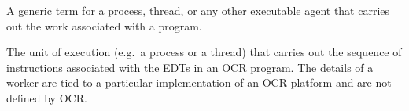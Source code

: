 \glossarydefstart
A generic term for a process, thread, or any other executable agent
that carries out the work associated with a program.
\glossarydefend



\glossarydefstart
The unit of execution (e.g.\ a process or a thread) that carries out
the sequence of instructions associated with the EDTs in an OCR
program. The details of a worker are tied to a particular
implementation of an OCR platform and are not defined by OCR.
\glossarydefend

